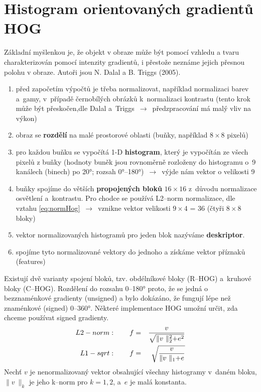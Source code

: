 \section{Histogram orientovaných gradientů HOG}
Základní myšlenkou je, že objekt v obraze může být pomocí vzhledu a tvaru charakterizován pomocí intenzity gradientů, i přestože neznáme jejich přesnou polohu v obraze. Autoři jsou N. Dalal a B. Triggs (2005).
\begin{enumerate}
    \item před započetím výpočtů je třeba normalizovat, například normalizaci barev a~gamy, v~případě černobílých obrázků k~normalizaci kontrastu (tento krok může být přeskočen,dle Dalal a~Triggs $\,\to\,$ předzpracování má malý vliv na výkon)
    \item obraz se \textbf{rozdělí} na malé prostorové oblasti (buňky, například $8 \times 8$ pixelů)
    \item pro každou buňku se vypočítá 1-D \textbf{histogram}, který je vypočítán ze všech pixelů z buňky (hodnoty buněk jsou rovnoměrně rozloženy do histogramu o~9 kanálech (binech) po \ang{20}; rozsah \ang{0}--\ang{180})  $\,\to\,$ výjde nám vektor o velikosti 9
    \item buňky spojíme do větších \textbf{propojených bloků} $16 \times 16$ z~důvodu normalizace osvětlení a~kontrastu. Pro chodce se používá L2--norm normalizace, dle vztahu \eqref{eq:normHog} $\,\to\,$ vznikne vektor velikosti $9\times4$ = 36 (čtyři $8 \times 8$ bloky)
    \item vektor normalizovaných histogramů pro jeden blok nazýváme \textbf{deskriptor}.
    \item spojíme tyto normalizované vektory do jednoho a získáme  vektor příznaků (features)
\end{enumerate}
Existují dvě varianty spojení bloků, tzv. obdélníkové bloky (R--HOG) a~kruhové bloky (C--HOG).
Rozdělení do rozsahu 0--\ang{180} proto, že se jedná o bezznaménkové gradienty (unsigned) a bylo dokázáno, že fungují lépe než znaménkové (signed) 0--\ang{360}. Některé implementace HOG umožní určit, zda chceme používat signed gradienty.
\begin{equation}
    \centering
    \label{eq:normHog}
    \begin{aligned}
        L2-norm & : \qquad  f = & \frac{v}{\sqrt{\lVert v~\lVert_2^2 + e^2}} \\
        L1-sqrt & : \qquad  f = & \sqrt{\frac{v}{\lVert v~\lVert_1 + e}}
    \end{aligned}
\end{equation}
Nechť $v$ je nenormalizovaný vektor obsahující všechny histogramy v~daném bloku, $\lVert v~\lVert_k$ je jeho k--norm pro $k = 1,2$, a~$e$ je malá konstanta.


